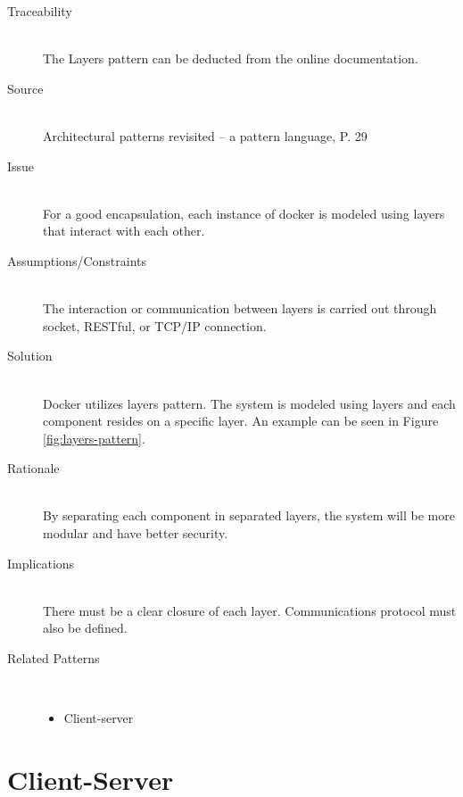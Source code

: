 \begin{description}
\item [Traceability]~\\
The Layers pattern can be deducted from the online documentation\cite{dockerarchi}.

\item [Source]~\\
Architectural patterns revisited -- a pattern language, P. 29 \cite{avgeriou2005architectural}

\item [Issue]~\\
For a good encapsulation, each instance of docker is modeled using layers that interact with each other.

\item [Assumptions/Constraints]~\\
The interaction or communication between layers is carried out through socket, RESTful, or TCP/IP connection.

\item [Solution]~\\
Docker utilizes layers pattern. The system is modeled using layers and each component resides on a specific layer. An example can be seen in Figure \ref{fig:layers-pattern}.

\item [Rationale] ~\\
By separating each component in separated layers, the system will be more modular and have better security.

\item [Implications]~\\
There must be a clear closure of each layer. Communications protocol must also be defined.

\item [Related Patterns]~\\
\begin{itemize}
	\item Client-server
\end{itemize}
\end{description}

\clearpage
\section{Client-Server}

